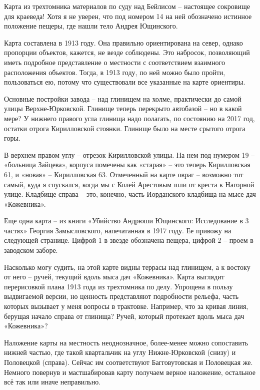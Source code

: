 Карта из трехтомника материалов по суду над Бей\-лисом\cite{beylisdelo} – настоящее сокровище для краеведа! Хотя я не уверен, что под номером 14 на ней обозначено истинное положение пещеры, где нашли тело Андрея Ющинского.

Карта составлена в 1913 году. Она правильно ориентирована на север, однако пропорции объектов, кажется, не везде соблюдены. Это набросок, позволяющий иметь подробное представление о местности с соответствием взаимного расположения объектов. Тогда, в 1913 году, по ней можно было пройти, пользоваться ею, потому что существовали все указанные на карте ориентиры.

Основные постройки завода – над глинищем на холме, практически до самой улицы Верхне-Юрковской. Глинище теперь перекрыто автобазой – но в какой мере? У нижнего правого угла глинища надо полагать, по состоянию на 2017 год, остатки отрога Кирилловской стоянки. Глинище было на месте срытого отрога горы.

В верхнем правом углу – отрезок Кирилловской улицы. На нем под нумером 19 – «больница Зайцева», корпуса помечены как «старая» – это теперь Кирилловская 61, и «новая» – Кирилловская 63. Отмеченный на карте овраг – возможно тот самый, куда я спускался, когда мы с Колей Арестовым шли от креста к Нагорной улице. Кладбище справа – это, конечно, часть Иорданского кладбища на мысе дач «Кожевника».

Еще одна карта – из книги «Убийство Андрюши Ющинского: Исследование в 3 частях» Георгия Замысловского, напечатанная в 1917 году. Ее привожу на следующей странице. Цифрой 1 в звезде обозначена пещера, цифрой 2 – проем в заводском заборе.

Насколько могу судить, на этой карте видны террасы над глинищем, а к востоку от него – ручей, текущий вдоль мыса дач «Кожевника». Карта выглядит перерисовкой плана 1913 года из трехтомника по делу. Упрощена в пользу выдвигаемой версии, но ценность представляют подробности рельефа, часть которых вызывает у меня вопросы в трактовке. Например, что за кривая линия, берущая начало справа от глинища? Ручей, который протекает вдоль мыса дач «Кожевника»? 

Наложение карты на местность неоднозначное, более-менее можно сопоставить нижней частью, где такой квартальчик на углу Нижне-Юрковской (снизу) и Половецкой (справа). Сейчас им соответствуют Багговутовская и Половецкая же. Немного повернув и мастшабировав карту получаем верное наложение, остальное всё так или иначе неправильно.

